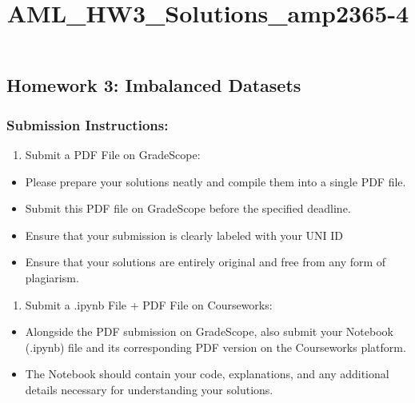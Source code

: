 \documentclass[11pt]{article}
\title{AML\_HW3\_Solutions\_amp2365-4}
\providecommand{\tightlist}{%
      \setlength{\itemsep}{0pt}\setlength{\parskip}{0pt}}
\begin{document}
    
    \maketitle
    
    

    
    \hypertarget{homework-3-imbalanced-datasets}{%
\subsection{Homework 3: Imbalanced
Datasets}\label{homework-3-imbalanced-datasets}}

\hypertarget{submission-instructions}{%
\subsubsection{Submission Instructions:}\label{submission-instructions}}

\begin{enumerate}
\def\labelenumi{\arabic{enumi}.}
\tightlist
\item
  Submit a PDF File on GradeScope:
\end{enumerate}

\begin{itemize}
\tightlist
\item
  Please prepare your solutions neatly and compile them into a single
  PDF file.
\item
  Submit this PDF file on GradeScope before the specified deadline.
\item
  Ensure that your submission is clearly labeled with your UNI ID
\item
  Ensure that your solutions are entirely original and free from any
  form of plagiarism.
\end{itemize}

\begin{enumerate}
\def\labelenumi{\arabic{enumi}.}
\setcounter{enumi}{1}
\tightlist
\item
  Submit a .ipynb File + PDF File on Courseworks:
\end{enumerate}

\begin{itemize}
\tightlist
\item
  Alongside the PDF submission on GradeScope, also submit your Notebook
  (.ipynb) file and its corresponding PDF version on the Courseworks
  platform.
\item
  The Notebook should contain your code, explanations, and any
  additional details necessary for understanding your solutions.
\end{itemize}
\end{document}
